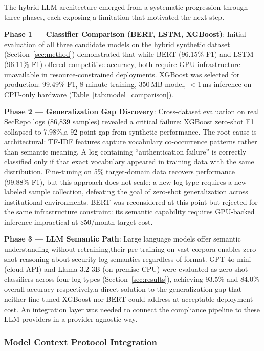 \documentclass[futureinternet,article,submit,pdftex,moreauthors]{Definitions/mdpi}
\begin{document}
The hybrid LLM architecture emerged from a systematic progression through three phases, each
exposing a limitation that motivated the next step.

\textbf{Phase 1 — Classifier Comparison (BERT, LSTM, XGBoost)}: Initial evaluation of all
three candidate models on the hybrid synthetic dataset (Section~\ref{sec:method}) demonstrated
that while BERT (96.15\% F1) and LSTM (96.11\% F1) offered competitive accuracy, both require
GPU infrastructure unavailable in resource-constrained deployments. XGBoost was selected for
production: 99.49\% F1, 8-minute training, 350\,MB model, ${<}$1\,ms inference on CPU-only
hardware (Table~\ref{tab:model_comparison}).

\textbf{Phase 2 — Generalization Gap Discovery}: Cross-dataset evaluation on real SecRepo logs
(86{,}839 samples) revealed a critical failure: XGBoost zero-shot F1 collapsed to 7.98\%,a
92-point gap from synthetic performance. The root cause is architectural: TF-IDF features
capture vocabulary co-occurrence patterns rather than semantic meaning. A log containing
``authentication failure'' is correctly classified only if that exact vocabulary appeared in
training data with the same distribution. Fine-tuning on 5\% target-domain data recovers
performance (99.88\% F1), but this approach does not scale: a new log type requires a new
labeled sample collection, defeating the goal of zero-shot generalization across institutional
environments. BERT was reconsidered at this point but rejected for the same infrastructure
constraint: its semantic capability requires GPU-backed inference impractical at
\$50/month target cost.

\textbf{Phase 3 — LLM Semantic Path}: Large language models offer semantic understanding
without retraining,their pre-training on vast corpora enables zero-shot reasoning about
security log semantics regardless of format. GPT-4o-mini (cloud API) and Llama-3.2-3B
(on-premise CPU) were evaluated as zero-shot classifiers across four log types
(Section~\ref{sec:results}), achieving 93.5\% and 84.0\% overall accuracy respectively,a
direct solution to the generalization gap that neither fine-tuned XGBoost nor BERT could
address at acceptable deployment cost. An integration layer was needed to connect the
compliance pipeline to these LLM providers in a provider-agnostic way.

\subsubsection{Model Context Protocol Integration}
\end{document}
